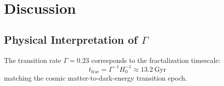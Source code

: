 \documentclass[aps,prl,twocolumn,groupedaddress]{revtex4-2}
\begin{document}
\section{Discussion}
\subsection{Physical Interpretation of $\Gamma$}
The transition rate $\Gamma=0.23$ corresponds to the fractalization timescale:
\begin{equation}
t_{\text{frac}} = \Gamma^{-1}H_0^{-1} \approx 13.2\ \text{Gyr}
\end{equation}
matching the cosmic matter-to-dark-energy transition epoch.

\vspace*{-1cm} %
\end{document}
